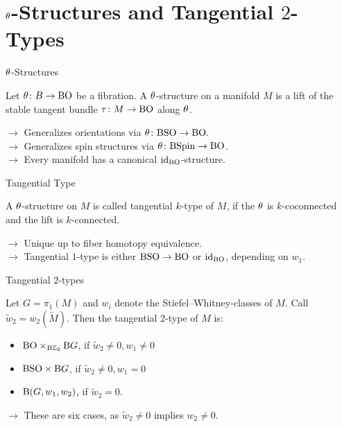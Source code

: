 \documentclass{presis}
\begin{document}
\appendix %
\section*{$\theta$-Structures and Tangential $2$-Types}

\begin{frame}{$\theta$-Structures}
    \begin{defi}
        Let $\theta\colon B\to \mathrm{BO}$ be a fibration. 
        A $\theta$-structure on a manifold $M$ is a lift of the stable tangent bundle $\tau\colon M \to \mathrm{BO}$ along $\theta$.
    \end{defi}\pause
    $\rightarrow$ Generalizes orientations via $\theta\colon \mathrm{BSO} \to \mathrm{BO}.$\\\vspace{.3\baselineskip} \pause
    $\rightarrow$ Generalizes spin structures via $\theta\colon\mathrm{BSpin} \to \mathrm{BO}$.\\\vspace{.3\baselineskip}\pause
    $\rightarrow$ Every manifold has a canonical $\operatorname{id}_{\mathrm{BO}}$-structure.
\end{frame}

\begin{frame}{Tangential Type}
    \begin{defi}
        A $\theta$-structure on $M$ is called tangential $k$-type of $M$, if the $\theta$ is $k$-coconnected and the lift is $k$-connected.
    \end{defi}\pause
    $\rightarrow$ Unique up to fiber homotopy equivalence.\\\vspace{.3\baselineskip}\pause
    $\rightarrow$ Tangential $1$-type is either $\mathrm{BSO}\to\mathrm{BO}$ or $\operatorname{id}_{\mathrm{BO}}$, depending on $w_1$.
\end{frame}

\begin{frame}{Tangential $2$-types}
\begin{thm}
    Let $G = \pi_1(M)$ and $w_i$ denote the Stiefel--Whitney-classes of $M$.
    Call $\widetilde{w}_2= w_2(\widetilde{M})$.
    Then the tangential $2$-type of $M$ is:
    \begin{itemize}
        \item $\mathrm{BO} \times_{\mathrm{B} \mathbb{Z}_2} \mathrm{B} G$, if $\widetilde{w}_2 \neq 0, w_1 \neq 0$
        \item $\mathrm{BSO} \times \mathrm{B} G$, if $\widetilde{w}_2 \neq 0, w_1 = 0$
        \item $\mathrm{B}(G,w_1,w_2)$, if $\widetilde{w}_2 = 0$.
    \end{itemize}
\end{thm}\pause
    $\rightarrow$ These are six cases, as $\widetilde{w}_2 \neq 0$ implies $w_2 \neq 0$.
\end{frame}
\end{document}
